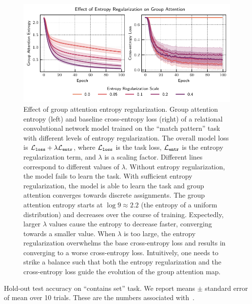 \begin{figure}[H]
    \centering
    \includegraphics{figs/experiments/group_attn_entropy.pdf}
    \caption{Effect of group attention entropy regularization. Group attention entropy (left) and baseline cross-entropy loss (right) of a relational convolutional network model trained on the ``match pattern'' task with different levels of entropy regularization. The overall model loss is ${\mathcal{L}}_{\mathtt{loss}} + \lambda {\mathcal{L}}_{\mathtt{entr}}$, where ${\mathcal{L}}_{\mathtt{loss}}$ is the task loss, ${\mathcal{L}}_{\mathtt{entr}}$ is the entropy regularization term, and $\lambda$ is a scaling factor. Different lines correspond to different values of $\lambda$. Without entropy regularization, the model fails to learn the task. With sufficient entropy regularization, the model is able to learn the task and group attention converges towards discrete assignments. The group attention entropy starts at $\log 9 \approx 2.2$ (the entropy of a uniform distribution) and decreases over the course of training. Expectedly, larger $\lambda$ values cause the entropy to decrease faster, converging towards a smaller value. When $\lambda$ is too large, the entropy regularization overwhelms the base cross-entropy loss and results in converging to a worse cross-entropy loss. Intuitively, one needs to strike a balance such that both the entropy regularization and the cross-entropy loss guide the evolution of the group attention map.}\label{fig:groupattn_entropy_reg}
\end{figure}

\begin{table}[H]
    \centering
    
    \caption{Hold-out test accuracy on ``contains set'' task. We report means $\pm$ standard error of mean over 10 trials. These are the numbers associated with~.}\label{tab:set_acc}
\end{table}

